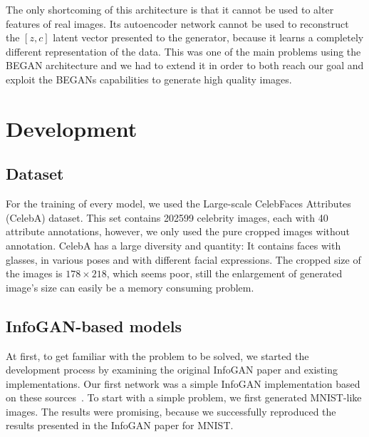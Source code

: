 \documentclass{egpubl}
\begin{document}
The only shortcoming of this architecture is that it cannot be used to alter features of real images. Its autoencoder network cannot be used to reconstruct the $[z,c]$ latent vector presented to the generator, because it learns a completely different representation of the data. This was one of the main problems using the BEGAN architecture and we had to extend it in order to both reach our goal and exploit the BEGANs capabilities to generate high quality images.


\section{Development}


\subsection{Dataset}

For the training of every model, we used the Large-scale CelebFaces Attributes (CelebA) dataset. This set contains 202599 celebrity images, each with 40 attribute annotations, however, we only used the pure cropped images without annotation. CelebA has a large diversity and quantity: It contains faces with glasses, in various poses and with different facial expressions. The cropped size of the images is $178\times 218$, which seems poor, still the enlargement of generated image's size can easily be a memory consuming problem.

\subsection{InfoGAN-based models}

At first, to get familiar with the problem to be solved, we started the development process by examining the original InfoGAN paper and existing implementations. Our first network was a simple InfoGAN implementation based on these sources~\cite{chen2016infogan}. To start with a simple problem, we first generated MNIST-like images. The results were promising, because we successfully reproduced the results presented in the InfoGAN paper for MNIST.
\end{document}
